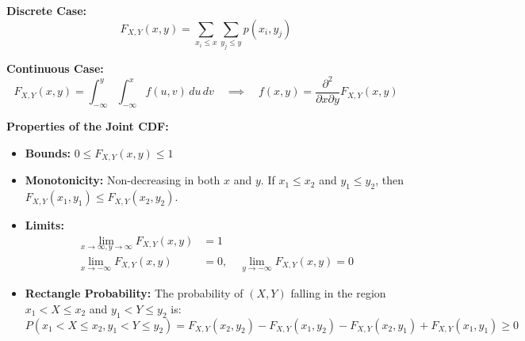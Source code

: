 \documentclass{article}
\begin{document}
\textbf{Discrete Case:}
\begin{equation*}
F_{X,Y}(x,y) = \sum_{x_i \le x} \sum_{y_j \le y} p(x_i, y_j)
\end{equation*}

\textbf{Continuous Case:}
\begin{equation*}
F_{X,Y}(x,y) = \int_{-\infty}^{y} \int_{-\infty}^{x} f(u, v) \,du\,dv \quad \implies \quad f(x,y) = \frac{\partial^2}{\partial x \partial y} F_{X,Y}(x,y)
\end{equation*}

\textbf{Properties of the Joint CDF:}
\begin{itemize}
    \item \textbf{Bounds:} $0 \le F_{X,Y}(x,y) \le 1$
    \item \textbf{Monotonicity:} Non-decreasing in both $x$ and $y$. If $x_1 \le x_2$ and $y_1 \le y_2$, then $F_{X,Y}(x_1, y_1) \le F_{X,Y}(x_2, y_2)$.
    \item \textbf{Limits:} 
    \begin{align*}
    \lim_{x \to \infty, y \to \infty} F_{X,Y}(x,y) &= 1 \\
    \lim_{x \to -\infty} F_{X,Y}(x,y) &= 0, \quad \lim_{y \to -\infty} F_{X,Y}(x,y) = 0
    \end{align*}
    \item \textbf{Rectangle Probability:} The probability of $(X,Y)$ falling in the region $x_1 < X \le x_2$ and $y_1 < Y \le y_2$ is:
    \begin{equation*}
    P(x_1 < X \le x_2, y_1 < Y \le y_2) = F_{X,Y}(x_2, y_2) - F_{X,Y}(x_1, y_2) - F_{X,Y}(x_2, y_1) + F_{X,Y}(x_1, y_1) \ge 0
    \end{equation*}
\end{itemize}
\end{document}
